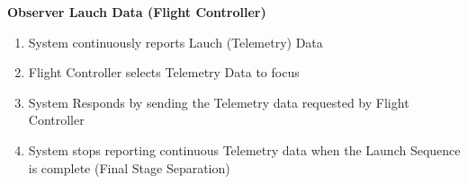 \documentclass[letterpaper]{article}
\begin{document}
\noindent
\textbf{Observer Lauch Data (Flight Controller)}
\begin{enumerate}
\item System continuously reports Lauch (Telemetry) Data
\item Flight Controller selects Telemetry Data to focus
\item System Responds by sending the Telemetry data requested by
Flight Controller
\item System stops reporting continuous Telemetry data when the Launch
Sequence is complete (Final Stage Separation)
\end{enumerate}
\end{document}
